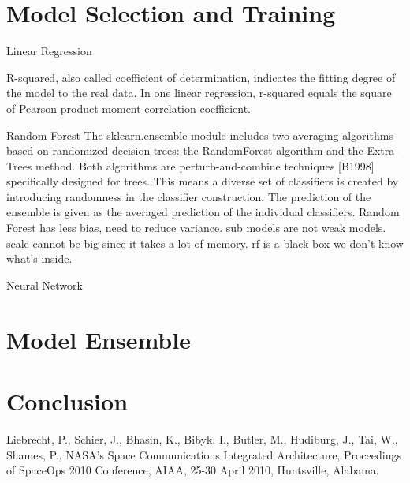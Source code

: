 \documentclass[conference]{IEEEtran}
\begin{document}
\section{Model Selection and Training}\label{v}
\indent Linear Regression

R-squared, also called coefficient of determination, indicates the fitting degree of the model to the real data. In one linear regression, r-squared equals the square of Pearson product moment correlation coefficient.

\indent Random Forest
The sklearn.ensemble module includes two averaging algorithms based on randomized decision trees: the RandomForest algorithm and the Extra-Trees method. Both algorithms are perturb-and-combine techniques [B1998] specifically designed for trees. This means a diverse set of classifiers is created by introducing randomness in the classifier construction. The prediction of the ensemble is given as the averaged prediction of the individual classifiers.
Random Forest has less bias, need to reduce variance. sub models are not weak models.
scale cannot be big since it takes a lot of memory. rf is a black box we don't know what's inside.

\indent Neural Network
%
\section{Model Ensemble}\label{vi}
%
\section{Conclusion}\label{vii}
%
\begin{thebibliography}{1}
Liebrecht, P., Schier, J., Bhasin, K., Bibyk, I., Butler, M., Hudiburg, J., Tai, W., Shames, P., NASA's Space Communications Integrated Architecture, Proceedings of SpaceOps 2010 Conference, AIAA, 25-30 April 2010, Huntsville,
Alabama.
\end{thebibliography}
\end{document}
